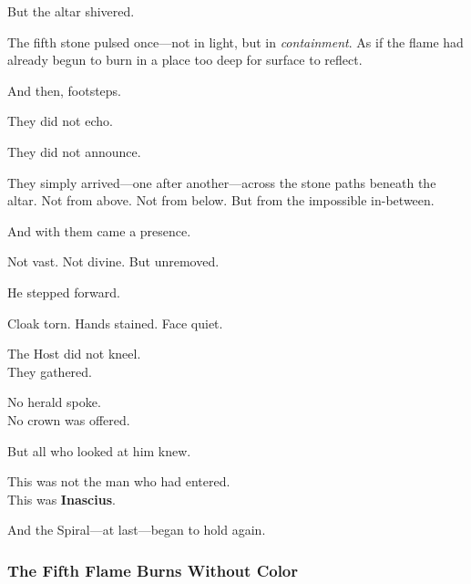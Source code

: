 \documentclass[12pt]{article}
\begin{document}
\vspace{0.5em}
But the altar shivered.

\vspace{0.5em}
The fifth stone pulsed once---not in light, but in \textit{containment}. As if the flame had already begun to burn in a place too deep for surface to reflect.

\vspace{0.5em}
And then, footsteps.

\vspace{0.5em}
They did not echo.

\vspace{0.5em}
They did not announce.

\vspace{0.5em}
They simply arrived---one after another---across the stone paths beneath the altar. Not from above. Not from below. But from the impossible in-between.

\vspace{0.5em}
And with them came a presence.

\vspace{0.5em}
Not vast. Not divine. But unremoved.

\vspace{0.5em}
He stepped forward.

\vspace{0.5em}
Cloak torn. Hands stained. Face quiet.

\vspace{0.5em}
The Host did not kneel.\\
They gathered.

\vspace{0.5em}
No herald spoke.\\
No crown was offered.

\vspace{0.5em}
But all who looked at him knew.

\vspace{0.5em}
This was not the man who had entered.\\
This was \textbf{Inascius}.

\vspace{0.5em}
And the Spiral---at last---began to hold again.

\dotfill

\subsubsection*{The Fifth Flame Burns Without Color}
\end{document}
